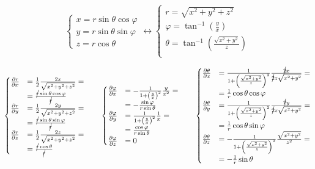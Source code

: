 \documentclass
[
a4paper,                      %
twoside,					  %
12pt,                         %
abstract,		      %
fleqn,                        %
]
{scrartcl} %
\begin{document}
\begin{description}
\begin{equation}
\begin{cases}
x=r\sin{\theta}\cos{\varphi}\\
y=r\sin{\theta}\sin{\varphi}\\
z=r\cos{\theta}
\end{cases}\longleftrightarrow\begin{cases}
r=\sqrt{x^{2}+y^{2}+z^{2}}\\
\varphi=\tan^{-1}\left(\frac{y}{x}\right)\\
\theta=\tan^{-1}\left(\frac{\sqrt{x^{2}+y^{2}}}{z}\right)\\
\end{cases}
\end{equation}

\begin{equation}
\begin{cases}
\frac{\partial r}{\partial x}&=\frac{1}{2}\frac{2x}{\sqrt{x^{2}+y^{2}+z^{2}}}=\\&=\frac{\cancel{r}\sin{\theta}\cos{\varphi}}{\cancel{r}}\\
\frac{\partial r}{\partial y}&=\frac{1}{2}\frac{2y}{\sqrt{x^{2}+y^{2}+z^{2}}}=\\&=\frac{\cancel{r}\sin{\theta}\sin{\varphi}}{\cancel{r}}\\
\frac{\partial r}{\partial z}&=\frac{1}{2}\frac{2z}{\sqrt{x^{2}+y^{2}+z^{2}}}=\\&=\frac{\cancel{r}\cos{\theta}}{\cancel{r}}\\
\end{cases}\qquad\begin{cases}
\frac{\partial \varphi}{\partial x}&=-\frac{1}{1+\left(\frac{y}{x}\right)^{2}}\frac{y}{x^{2}}=\\&=-\frac{\sin{\varphi}}{r\sin{\theta}}\\
\frac{\partial \varphi}{\partial y}&=\frac{1}{1+\left(\frac{y}{x}\right)^{2}}\frac{1}{x}=\\&=\frac{\cos{\varphi}}{r\sin{\theta}}\\
\frac{\partial \varphi}{\partial z}&=0\\
\end{cases}\qquad\begin{cases}
\frac{\partial \theta}{\partial x}&=\frac{1}{1+\left(\frac{\sqrt{x^{2}+y^{2}}}{z}\right)^{2}}\frac{\cancel{2}x}{\cancel{2}z\sqrt{x^{2}+y^{2}}}=\\&=\frac{1}{r}\cos{\theta}\cos{\varphi}\\
\frac{\partial \theta}{\partial y}&=\frac{1}{1+\left(\frac{\sqrt{x^{2}+y^{2}}}{z}\right)^{2}}\frac{\cancel{2}y}{\cancel{2}z\sqrt{x^{2}+y^{2}}}=\\&=\frac{1}{r}\cos{\theta}\sin{\varphi}\\
\frac{\partial \theta}{\partial z}&=-\frac{1}{1+\left(\frac{\sqrt{x^{2}+y^{2}}}{z}\right)^{2}}\frac{\sqrt{x^{2}+y^{2}}}{z^{2}}=\\&=-\frac{1}{r}\sin{\theta}\\
\end{cases}
\end{equation}


\end{description}
\end{document}
